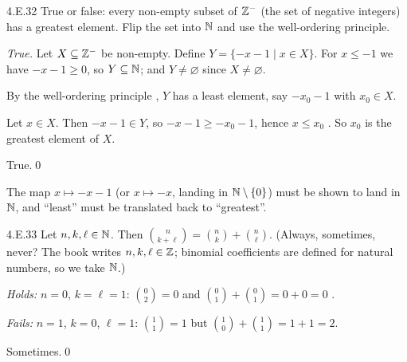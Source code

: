 \begin{bookex}[essential]{4.E.32}
True or false: every non-empty subset of $\mathbb{Z}^-$ (the set of negative integers) has a greatest element.
\solution
\plan Flip the set into $\mathbb{N}$ and use the well-ordering principle.
\begin{steps}
\item \emph{True.} Let $X\subseteq\mathbb{Z}^-$ be non-empty. Define $Y=\{-x-1\mid x\in X\}$. For $x\le-1$ we have $-x-1\ge0$, so $Y\subseteq\mathbb{N}$; and $Y\ne\varnothing$ since $X\ne\varnothing$.
\item By the well-ordering principle , $Y$ has a least element, say $-x_0-1$ with $x_0\in X$.
\item Let $x\in X$. Then $-x-1\in Y$, so $-x-1\ge-x_0-1$, hence $x\le x_0$ . So $x_0$ is the greatest element of $X$.
\end{steps}
\conclusion True.\qed
\begin{compare}
\item The map $x\mapsto-x-1$ (or $x\mapsto-x$, landing in $\mathbb{N}\setminus\{0\}$) must be shown to land in $\mathbb{N}$, and ``least'' must be translated back to ``greatest''.
\end{compare}
\end{bookex}

\begin{bookex}[recommended]{4.E.33}
Let $n,k,\ell\in\mathbb{N}$. Then $\binom n{k+\ell}=\binom nk+\binom n\ell$. (Always, sometimes, never? The book writes $n,k,\ell\in\mathbb{Z}$; binomial coefficients are defined for natural numbers, so we take $\mathbb{N}$.)
\solution
\begin{steps}
\item \emph{Holds:} $n=0$, $k=\ell=1$: $\binom02=0$ and $\binom01+\binom01=0+0=0$ .
\item \emph{Fails:} $n=1$, $k=0$, $\ell=1$: $\binom11=1$ but $\binom10+\binom11=1+1=2$.
\end{steps}
\conclusion Sometimes.\qed
\end{bookex}

